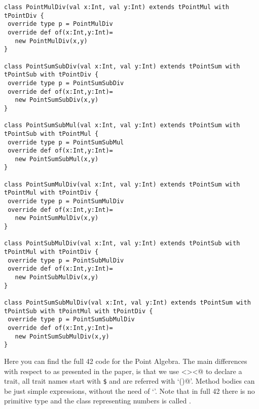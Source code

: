 \begin{lstlisting}[basicstyle=\tiny]
class PointMulDiv(val x:Int, val y:Int) extends tPointMul with tPointDiv {
 override type p = PointMulDiv
 override def of(x:Int,y:Int)=
   new PointMulDiv(x,y)
}

class PointSumSubDiv(val x:Int, val y:Int) extends tPointSum with tPointSub with tPointDiv {
 override type p = PointSumSubDiv
 override def of(x:Int,y:Int)=
   new PointSumSubDiv(x,y)
}

class PointSumSubMul(val x:Int, val y:Int) extends tPointSum with tPointSub with tPointMul {
 override type p = PointSumSubMul
 override def of(x:Int,y:Int)=
   new PointSumSubMul(x,y)
}

class PointSumMulDiv(val x:Int, val y:Int) extends tPointSum with tPointMul with tPointDiv {
 override type p = PointSumMulDiv
 override def of(x:Int,y:Int)=
   new PointSumMulDiv(x,y)
}

class PointSubMulDiv(val x:Int, val y:Int) extends tPointSub with tPointMul with tPointDiv {
 override type p = PointSubMulDiv
 override def of(x:Int,y:Int)=
   new PointSubMulDiv(x,y)
}

class PointSumSubMulDiv(val x:Int, val y:Int) extends tPointSum with tPointSub with tPointMul with tPointDiv {
 override type p = PointSumSubMulDiv
 override def of(x:Int,y:Int)=
   new PointSumSubMulDiv(x,y)
}
\end{lstlisting}

Here you can find the full 42 code for the Point Algebra.
The main differences with respect to \name as presented in
the paper, is that we use \Q@Resource<><@
to declare a trait,
all trait names start with \texttt{\$}
and are referred with `\Q@()@'.
Method bodies can be just simple expressions, without the need
of `\Q@return@'.
Note that in full 42 there is no primitive type \Q@int@ and
the class representing numbers is called \Q@Num@.

